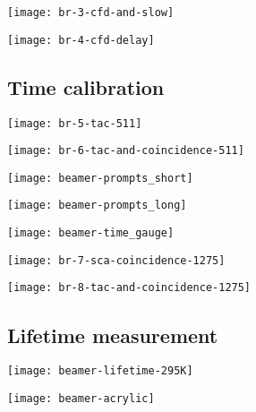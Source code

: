 \documentclass[english, fleqn]{beamer}
\begin{document}
\begin{frame}
    \texttt{[image: br-3-cfd-and-slow]}
\end{frame}


\begin{frame}
    \texttt{[image: br-4-cfd-delay]}
\end{frame}


\subsection{Time calibration}

\begin{frame}
    \texttt{[image: br-5-tac-511]}
\end{frame}


\begin{frame}
    \texttt{[image: br-6-tac-and-coincidence-511]}
\end{frame}


\begin{frame}
    \texttt{[image: beamer-prompts\_short]}
\end{frame}


\begin{frame}
    \texttt{[image: beamer-prompts\_long]}
\end{frame}


\begin{frame}
    \texttt{[image: beamer-time\_gauge]}
\end{frame}


\begin{frame}
    \texttt{[image: br-7-sca-coincidence-1275]}
\end{frame}


\begin{frame}
    \texttt{[image: br-8-tac-and-coincidence-1275]}
\end{frame}


\subsection{Lifetime measurement}

\begin{frame}
    \texttt{[image: beamer-lifetime-295K]}
\end{frame}


\begin{frame}
    \texttt{[image: beamer-acrylic]}
\end{frame}
\end{document}
